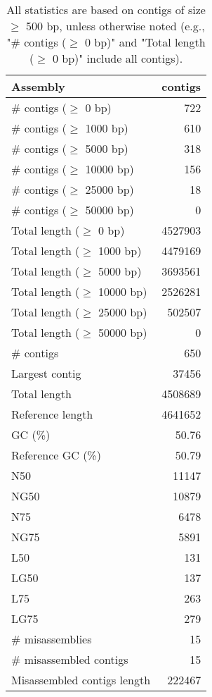 \documentclass[12pt,a4paper]{article}
\begin{document}
\begin{table}[ht]
\begin{center}
\caption{All statistics are based on contigs of size $\geq$ 500 bp, unless otherwise noted (e.g., "\# contigs ($\geq$ 0 bp)" and "Total length ($\geq$ 0 bp)" include all contigs).}
\begin{tabular}{|l*{1}{|r}|}
\hline
Assembly & contigs \\ \hline
\# contigs ($\geq$ 0 bp) & 722 \\ \hline
\# contigs ($\geq$ 1000 bp) & 610 \\ \hline
\# contigs ($\geq$ 5000 bp) & 318 \\ \hline
\# contigs ($\geq$ 10000 bp) & 156 \\ \hline
\# contigs ($\geq$ 25000 bp) & 18 \\ \hline
\# contigs ($\geq$ 50000 bp) & 0 \\ \hline
Total length ($\geq$ 0 bp) & 4527903 \\ \hline
Total length ($\geq$ 1000 bp) & 4479169 \\ \hline
Total length ($\geq$ 5000 bp) & 3693561 \\ \hline
Total length ($\geq$ 10000 bp) & 2526281 \\ \hline
Total length ($\geq$ 25000 bp) & 502507 \\ \hline
Total length ($\geq$ 50000 bp) & 0 \\ \hline
\# contigs & 650 \\ \hline
Largest contig & 37456 \\ \hline
Total length & 4508689 \\ \hline
Reference length & 4641652 \\ \hline
GC (\%) & 50.76 \\ \hline
Reference GC (\%) & 50.79 \\ \hline
N50 & 11147 \\ \hline
NG50 & 10879 \\ \hline
N75 & 6478 \\ \hline
NG75 & 5891 \\ \hline
L50 & 131 \\ \hline
LG50 & 137 \\ \hline
L75 & 263 \\ \hline
LG75 & 279 \\ \hline
\# misassemblies & 15 \\ \hline
\# misassembled contigs & 15 \\ \hline
Misassembled contigs length & 222467 \\ \hline

\end{tabular}
\end{center}
\end{table}
\end{document}
